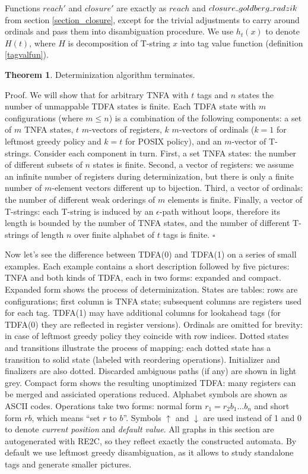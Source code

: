 \documentclass{article}
\newcommand{\Xund}{\rule{.4em}{.4pt}} %
\newcommand{\Xeq}{\!=\!}
\theoremstyle{definition}
\newtheorem{XThe}{Theorem}
\begin{document}
\begin{multicols}{2}
Functions $reach'$ and $closure'$ are exactly as
$reach$ and $closure \Xund goldberg \Xund radzik$ from section \ref{section_closure},
except for the trivial adjustments to carry around ordinals and pass them into disambiguation procedure.
We use $h_t(x)$ to denote $H(t)$, where $H$ is decomposition of T-string $x$ into tag value function (definition \ref{tagvalfun}).


\begin{XThe}
Determinization algorithm terminates.

\smallskip

Proof.
We will show that for arbitrary TNFA with $t$ tags and $n$ states the number of unmappable TDFA states is finite.
Each TDFA state with $m$ configurations (where $m \!\leq\! n$) is a combination of the following components:
a set of $m$ TNFA states,
$t$ $m$-vectors of registers,
$k$ $m$-vectors of ordinals ($k \Xeq 1$ for leftmost greedy policy and $k \Xeq t$ for POSIX policy),
and an $m$-vector of T-strings.
Consider each component in turn.
First, a set TNFA states: the number of different subsets of $n$ states is finite.
Second, a vector of registers: we assume an infinite number of registers during determinization,
but there is only a finite number of $m$-element vectors different up to bijection.
Third, a vector of ordinals: the number of different weak orderings of $m$ elements is finite.
Finally, a vector of T-strings: each T-string is induced by an $\epsilon$-path without loops,
therefore its length is bounded by the number of TNFA states,
and the number of different T-strings of length $n$ over finite alphabet of $t$ tags is finite.
$\square$
\end{XThe}


Now let's see the difference between TDFA(0) and TDFA(1) on a series of small examples.
Each example contains a short description followed by five pictures:
TNFA and both kinds of TDFA, each in two forms: expanded and compact.
Expanded form shows the process of determinization.
States are tables: rows are configurations; first column is TNFA state;
subsequent columns are registers used for each tag.
TDFA(1) may have additional columns for lookahead tags (for TDFA(0) they are reflected in register versions).
Ordinals are omitted for brevity: in case of leftmost greedy policy they coincide with row indices.
Dotted states and transitions illustrate the process of mapping:
each dotted state has a transition to solid state (labeled with reordering operations).
Initializer and finalizers are also dotted.
Discarded ambiguous paths (if any) are shown in light grey.
Compact form shows the resulting unoptimized TDFA: many registers can be merged and assiciated operations reduced.
Alphabet symbols are shown as ASCII codes.
Operations take two forms: normal form $r_1 \Xeq r_2 b_1 \dots b_n$
and short form $r b$, which means ``set $r$ to $b$''.
Symbols $\uparrow$ and $\downarrow$ are used instead of 1 and 0 to denote \emph{current position} and \emph{default value}.
All graphs in this section are autogenerated with RE2C, so they reflect exactly the constructed automata.
By default we use leftmost greedy disambiguation, as it allows to study standalone tags and generate smaller pictures.
\\


\end{multicols}
\end{document}
